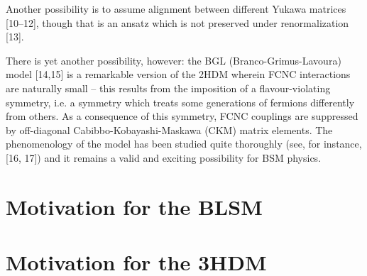 \documentclass[11pt]{article}
\begin{document}
Another possibility is to assume alignment between different Yukawa matrices [10–12], though that is an ansatz which is not preserved
under renormalization [13].
%
%
%

There is yet another possibility, however: the BGL (Branco-Grimus-Lavoura)
model [14,15] is a remarkable version of the 2HDM wherein FCNC interactions are naturally small – this results
from the imposition of a flavour-violating symmetry, i.e. a symmetry which treats some generations of fermions
differently from others.
%
As a consequence of this symmetry, FCNC couplings are suppressed by off-diagonal
Cabibbo-Kobayashi-Maskawa (CKM) matrix elements. The phenomenology of the model has been studied quite
thoroughly (see, for instance, [16, 17]) and it remains a valid and exciting possibility for BSM physics.


\section{Motivation for the BLSM}

\section{Motivation for the 3HDM}
\end{document}

